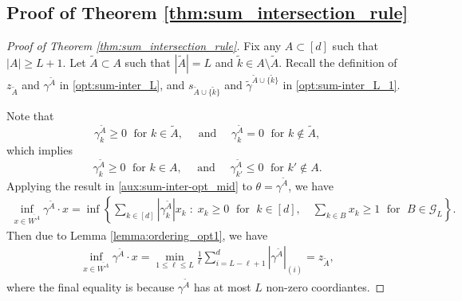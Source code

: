 \documentclass[aap,preprint]{imsart}
\theoremstyle{plain}
\theoremstyle{definition}
\begin{document}
\begin{appendix}
\subsection{Proof of Theorem \ref{thm:sum_intersection_rule}} \label{app:proof_theorem_SI}
\begin{proof}[Proof of Theorem \ref{thm:sum_intersection_rule}]
Fix any $A \subset [d]$ such that $|A| \geq L+1$. Let $\tilde{A} \subset A$ such that $|\tilde{A}| = L$ and $\tilde{k} \in A \setminus \tilde{A}$. Recall the definition of $z_{\tilde{A}}$ and $\gamma^{\tilde{A}}$ in \eqref{opt:sum-inter_L}, and $s_{\tilde{A} \cup \{\tilde{k}\}}$ and $\tilde{\gamma}^{\tilde{A} \cup \{\tilde{k}\}}$ in \eqref{opt:sum-inter_L_1}.

Note that
$$
\gamma^{\tilde{A}}_k \geq 0 \; \text{ for } k \in \tilde{A}, \quad \text{ and } \quad
\gamma^{\tilde{A}}_k = 0 \; \text{ for } k \not \in \tilde{A},
$$
which implies
$$
\gamma^{\tilde{A}}_k \geq 0 \; \text{ for } k \in A,  \quad \text{ and } \quad
\gamma^{\tilde{A}}_{k'} \leq 0 \; \text{ for } k' \not \in A. 
$$
Applying the result in \eqref{aux:sum-inter-opt_mid} to $\theta = \gamma^{\tilde{A}}$, we have
\begin{align*}
 \inf_{x \in \overline{W^{{A}}}}  \gamma^{\tilde{A}} \cdot x = \inf\left\{\sum_{k \in [d]} |\gamma^{\tilde{A}}_k| x_k \;:\;  x_k \geq 0\; \text{ for } \;k \in [d],  \quad 
 \sum_{k \in B} x_k \geq 1\; \text{ for } \;B \in \mathcal{G}_L \right\}.
\end{align*}
Then due to Lemma \ref{lemma:ordering_opt1}, we have
\begin{align*}
\inf_{x \in \overline{W^{{A}}}}  \gamma^{\tilde{A}} \cdot x  =      \min_{1 \leq \ell \leq L} \frac{1}{\ell} \sum_{i = L - \ell + 1}^{d} |\gamma^{\tilde{A}}|_{(i)} = z_{\tilde{A}},
\end{align*}
where the final equality is because $\gamma^{\tilde{A}}$ has at most $L$ non-zero coordiantes.


\end{proof}
\end{appendix}
\end{document}
